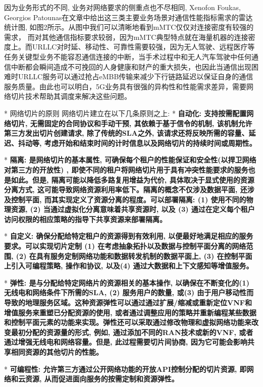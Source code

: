 		因为业务形式的不同, 业务对网络要求的侧重点也不尽相同, Xenofon Foukas, Georgios Patounas在文章中给出这三类主要业务场景对通信性能指标需求的雷达统计图, 如图2所示。从图中我们可以清晰地看到mMTC仅仅对连接密度有较强的需求， 而对其他通信指标要求较弱，因为mMTC典型特点就在海量机器的连接密度上。而URLLC对时延、移动性、可靠性需要较强，因为无人驾驶、远程医疗等任务关键型业务不能容忍通信连接的中断，当手术过程中和无人汽车驾驶中任何通信中断都会瞬间造成不可挽回的人身健康和财产的重大损失，也因此当通信出现困难时URLLC服务可以通过抢占eMBB传输来减少下行链路延迟以保证自身的通信服务质量。由此也可以明白，5G业务具有很强的异构性和性能需求差异，需要网络切片技术帮助其调度来解决这些问题。
		
	* 网络切片的原则
		网络切片建立在以下几条原则之上: 
		* \bf{自动化}: 支持按需配置网络切片, 无需固定的合同协议和手动干预, 其依赖于基于信令的机制, 该机制允许第三方发出切片创建请求, 除了传统的SLA之外, 该请求还将反映所需的容量、延迟、抖动等, 考虑开始和结束时间的计时信息以及网络切片的持续时间或周期性。

		* \bf{隔离}: 是网络切片的基本属性, 可确保每个租户的性能保证和安全性(以捍卫网络对第三方的开放性) , 即使不同的租户将网络切片用于具有冲突性能要求的服务也是如此。但是, 隔离可能以降低多路复用增益为代价, 具体取决于显式使用的资源分离方式, 这可能导致网络资源利用率低下。隔离的概念不仅涉及数据平面, 还涉及控制平面, 而其实现定义了资源分离的程度。可以部署隔离: (1)  使用不同的物理资源, (2)  当通过虚拟化分离意味着共享资源时, 以及 (3) 通过在定义每个租户访问权限的相应策略的指导下共享资源来部署隔离。

		* \bf{自定义}: 确保分配给特定租户的资源得到有效利用, 以便最好地满足相应的服务要求。可以实现切片定制 (1) 在考虑抽象拓扑以及数据与控制平面分离的网络范围, (2) 在具有服务定制网络功能和数据转发机制的数据平面上, (3) 在控制平面上引入可编程策略, 操作和协议, 以及(4) 通过大数据和上下文感知等增值服务。

		* \bf{弹性}: 是与分配给特定网络片的资源相关的基本操作, 以确保在不断变化的(1) 无线电和网络条件下所需的SLA, (2) 服务用户的数量, 或(3) 由于用户移动性而导致的地理服务区域。这种资源弹性可以通过通过扩展/缩减或重新定位VNF和增值服务来重塑已分配资源的使用, 或者通过调整应用的策略并重新编程某些数据和控制平面元素的功能来实现。弹性还可以采取通过修改物理和虚拟网络功能来改变最初分配的资源量的形式, 例如, 通过添加不同的RAN技术或新的VNF, 或者通过增强无线电和网络容量。但是, 此过程需要切片间协商, 因为它可能会影响共享相同资源的其他切片的性能。

		* \bf{可编程性}: 允许第三方通过公开网络功能的开放API控制分配的切片资源, 即网络和云资源, 从而促进面向服务的按需定制和资源弹性。

